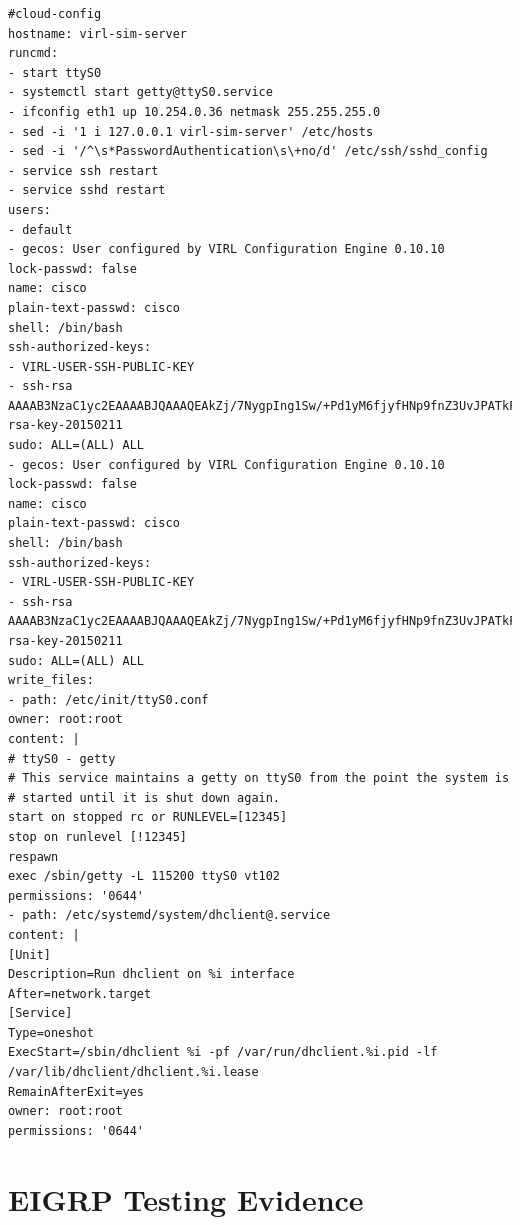 \documentclass[11pt]{report}
\begin{document}
\begin{appendices}
\begin{lstlisting}
#cloud-config
hostname: virl-sim-server
runcmd:
- start ttyS0
- systemctl start getty@ttyS0.service
- ifconfig eth1 up 10.254.0.36 netmask 255.255.255.0
- sed -i '1 i 127.0.0.1 virl-sim-server' /etc/hosts
- sed -i '/^\s*PasswordAuthentication\s\+no/d' /etc/ssh/sshd_config
- service ssh restart
- service sshd restart
users:
- default
- gecos: User configured by VIRL Configuration Engine 0.10.10
lock-passwd: false
name: cisco
plain-text-passwd: cisco
shell: /bin/bash
ssh-authorized-keys:
- VIRL-USER-SSH-PUBLIC-KEY
- ssh-rsa AAAAB3NzaC1yc2EAAAABJQAAAQEAkZj/7NygpIng1Sw/+Pd1yM6fjyfHNp9fnZ3UvJPATkFrm8+w5TynYuz/uNk4G0pR/ffT9SLMbvUXKbyJQqlsTCx9PwwFB92AY6BZTOfa9Zy/J4F19tCBMoIaGf7YmJVFLSTkiSrmxPMqlWsDD6rx3b70MLihkCDcvmzHTeDNT2WGkwTjqfUJyZ7PMvgwhU80QmB3z3H/JikWWDZWUQiT7kf/7nSCG1MOWILm6Gj1Grxe4ek0+PzO8zyLhKr1TYIqoawO0HiMVb13NTBOJIMQ0T0T8uh1wphjXPdLzPXQ25iUs1sRF+9R8ZPg3CT46Wx//YmxdwodHTxW7bShq1sKJw==
rsa-key-20150211
sudo: ALL=(ALL) ALL
- gecos: User configured by VIRL Configuration Engine 0.10.10
lock-passwd: false
name: cisco
plain-text-passwd: cisco
shell: /bin/bash
ssh-authorized-keys:
- VIRL-USER-SSH-PUBLIC-KEY
- ssh-rsa AAAAB3NzaC1yc2EAAAABJQAAAQEAkZj/7NygpIng1Sw/+Pd1yM6fjyfHNp9fnZ3UvJPATkFrm8+w5TynYuz/uNk4G0pR/ffT9SLMbvUXKbyJQqlsTCx9PwwFB92AY6BZTOfa9Zy/J4F19tCBMoIaGf7YmJVFLSTkiSrmxPMqlWsDD6rx3b70MLihkCDcvmzHTeDNT2WGkwTjqfUJyZ7PMvgwhU80QmB3z3H/JikWWDZWUQiT7kf/7nSCG1MOWILm6Gj1Grxe4ek0+PzO8zyLhKr1TYIqoawO0HiMVb13NTBOJIMQ0T0T8uh1wphjXPdLzPXQ25iUs1sRF+9R8ZPg3CT46Wx//YmxdwodHTxW7bShq1sKJw==
rsa-key-20150211
sudo: ALL=(ALL) ALL
write_files:
- path: /etc/init/ttyS0.conf
owner: root:root
content: |
# ttyS0 - getty
# This service maintains a getty on ttyS0 from the point the system is
# started until it is shut down again.
start on stopped rc or RUNLEVEL=[12345]
stop on runlevel [!12345]
respawn
exec /sbin/getty -L 115200 ttyS0 vt102
permissions: '0644'
- path: /etc/systemd/system/dhclient@.service
content: |
[Unit]
Description=Run dhclient on %i interface
After=network.target
[Service]
Type=oneshot
ExecStart=/sbin/dhclient %i -pf /var/run/dhclient.%i.pid -lf /var/lib/dhclient/dhclient.%i.lease
RemainAfterExit=yes
owner: root:root
permissions: '0644'

\end{lstlisting}

\chapter{EIGRP Testing Evidence}


\end{appendices}
\end{document}
